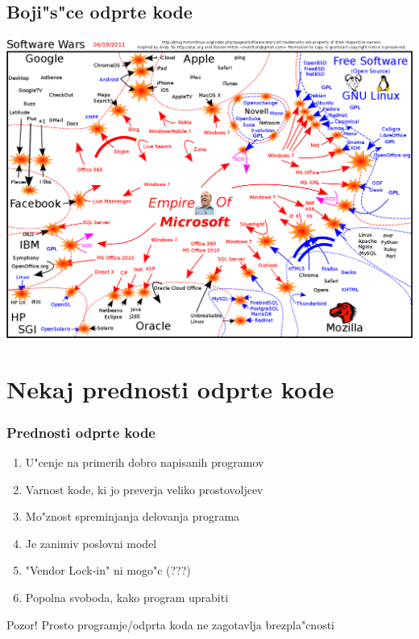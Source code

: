 \documentclass{beamer}
\begin{document}
\subsection{Boji"s"ce odprte kode}
\begin{frame}
\begin{center}
\includegraphics[width=0.9\linewidth]{slike/software_wars.png}
\end{center}
\end{frame}


\section{Nekaj prednosti odprte kode}
\begin{frame}
\frametitle{Prednosti odprte kode}
\begin{enumerate}
\item U"cenje na primerih dobro napisanih programov
\item Varnost kode, ki jo preverja veliko prostovoljcev
\item Mo"znost spreminjanja delovanja programa
\item Je zanimiv poslovni model
\item "Vendor Lock-in" ni mogo"c (???)
\item Popolna svoboda, kako program uprabiti
\end{enumerate}
\begin{alert}{Pozor!}
Prosto programje/odprta koda ne zagotavlja brezpla"cnosti
\end{alert}
\end{frame}
\end{document}
